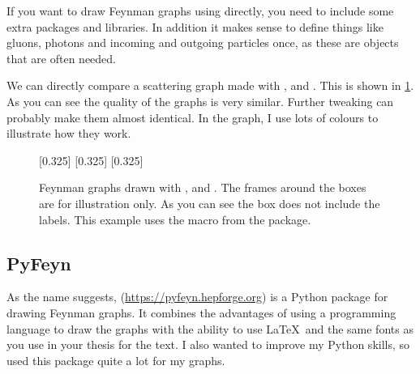 If you want to draw Feynman graphs using \TikZ directly,
you need to include some extra \TikZ packages and libraries.
In addition it makes sense to
define things like gluons, photons and incoming and outgoing particles
once, as these are objects that are often needed.

We can directly compare a scattering graph made with
, \Package{\TikZ} and .
This is shown in \cref{fig:feyn:cf}.
As you can see the quality of the graphs is very similar.
Further tweaking can probably make them almost identical.
In the  graph, I use lots of colours to illustrate how they work.

\begin{figure}[htbp]
\begin{tcblisting}{}
\centering
{}
  [0.325\textwidth]{
}
\subcaptionbox{\TikZ\label{fig:feyn:tikz}}
  [0.325\textwidth]{\fbox{%
    
  }
}
  [0.325\textwidth]{\fbox{%
    
  }
}
\caption{Feynman graphs drawn with , \Package{\TikZ} and .
  The frames around the boxes are for illustration only.
  As you can see the  box does not include the labels.
  This example uses the  macro from the  package.}%
\label{fig:feyn:cf}
\end{tcblisting}
\end{figure}


\subsection{PyFeyn}%
\label{sec:fig:pyfeyn}

As the name suggests,  (\url{https://pyfeyn.hepforge.org})
is a Python package for drawing Feynman graphs.
It combines the advantages of using a programming language to draw the graphs
with the ability to use \LaTeX\ and the same fonts as you use in your thesis for the text.
I also wanted to improve my Python skills, so used this package quite a lot for my graphs.

